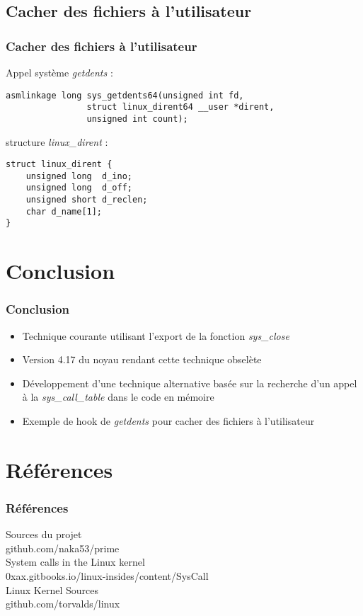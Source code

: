 \documentclass{beamer}
\begin{document}
\subsection{Cacher des fichiers à l'utilisateur}

\begin{frame}[fragile]
\frametitle{Cacher des fichiers à l'utilisateur}
Appel système \textit{getdents} :
\begin{lstlisting}[style=CStyle]
asmlinkage long sys_getdents64(unsigned int fd,
				struct linux_dirent64 __user *dirent,
				unsigned int count);
\end{lstlisting}
\medskip
structure \textit{linux\_dirent} :
\begin{lstlisting}[style=CStyle]
 struct linux_dirent {
	unsigned long  d_ino;
	unsigned long  d_off;
	unsigned short d_reclen;
	char d_name[1]; 
}
\end{lstlisting}
\end{frame}

\section{Conclusion}

\begin{frame}[fragile]
\frametitle{Conclusion}
\begin{itemize}
\item 	Technique courante utilisant l'export de la fonction \textit{sys\_close}
\item 	Version 4.17 du noyau rendant cette technique obselète
\item 	Développement d'une technique alternative basée sur la recherche d'un appel à la \textit{sys\_call\_table} dans le code en mémoire
\item 	Exemple de hook de \textit{getdents} pour cacher des fichiers à l'utilisateur
\end{itemize}
\end{frame}

\section{Références}

\begin{frame}[allowframebreaks]
\frametitle{Références}
\begin{thebibliography}{1}
	Sources du projet\\
	github.com/naka53/prime\\

	System calls in the Linux kernel\\
	0xax.gitbooks.io/linux-insides/content/SysCall\\

	Linux Kernel Sources\\
	github.com/torvalds/linux\\
\end{thebibliography}
\end{frame}
\end{document}
